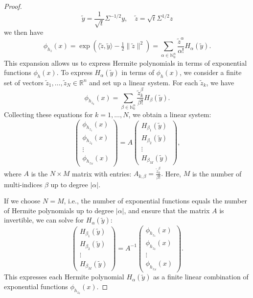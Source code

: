\documentclass[11pt]{amsart}
\theoremstyle{definition}
\theoremstyle{remark}
\numberwithin{equation}{section}
\begin{document}
\begin{proof}
\[
\tilde{y} = \frac{1}{\sqrt{t}} \Sigma^{-1/2} y, \quad \tilde{z} = \sqrt{t} \Sigma^{1/2} z
\]
we then have \[
\phi_{h_z}(x) = \exp\left( \langle \tilde{z}, \tilde{y} \rangle - \tfrac{1}{2} \| \tilde{z} \|^2 \right) = \sum_{\alpha \in \mathbb{N}_0^n} \frac{\tilde{z}^\alpha}{\alpha!} H_\alpha(\tilde{y}).
\]
This expansion allows us to express Hermite polynomials in terms of exponential functions \( \phi_h(x) \). To express \( H_\alpha(\tilde{y}) \) in terms of \( \phi_h(x) \), we consider a finite set of vectors \( \tilde{z}_1, \dots, \tilde{z}_N \in \mathbb{R}^n \) and set up a linear system. For each \( \tilde{z}_k \), we have
\[
\phi_{h_{z_k}}(x) = \sum_{\beta \in \mathbb{N}_0^n} \frac{\tilde{z}_k^\beta}{\beta!} H_\beta(\tilde{y}).
\]
Collecting these equations for \( k = 1, \dots, N \), we obtain a linear system:
\[
\begin{pmatrix}
\phi_{h_{z_1}}(x) \\
\phi_{h_{z_2}}(x) \\
\vdots \\
\phi_{h_{z_N}}(x)
\end{pmatrix}
=
A
\begin{pmatrix}
H_{\beta_1}(\tilde{y}) \\
H_{\beta_2}(\tilde{y}) \\
\vdots \\
H_{\beta_M}(\tilde{y})
\end{pmatrix},
\]
where \( A \) is the \( N \times M \) matrix with entries:
\(
A_{k, \beta} = \frac{\tilde{z}_k^\beta}{\beta!}.
\) Here, \( M \) is the number of multi-indices \( \beta \) up to degree \( |\alpha| \).

If we choose \( N = M \), i.e., the number of exponential functions equals the number of Hermite polynomials up to degree \( |\alpha| \), and ensure that the matrix \( A \) is invertible, we can solve for \( H_\alpha(\tilde{y}) \):
\[
\begin{pmatrix}
H_{\beta_1}(\tilde{y}) \\
H_{\beta_2}(\tilde{y}) \\
\vdots \\
H_{\beta_M}(\tilde{y})
\end{pmatrix}
=
A^{-1}
\begin{pmatrix}
\phi_{h_{z_1}}(x) \\
\phi_{h_{z_2}}(x) \\
\vdots \\
\phi_{h_{z_N}}(x)
\end{pmatrix}.
\]
This expresses each Hermite polynomial \( H_\alpha(\tilde{y}) \) as a finite linear combination of exponential functions \( \phi_{h_{z_k}}(x) \).


\end{proof}
\end{document}

